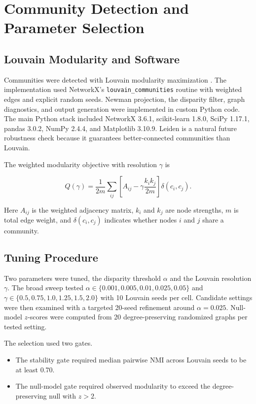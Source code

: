 \documentclass[10pt,twocolumn]{article}
\begin{document}
\section{Community Detection and Parameter Selection}

\subsection{Louvain Modularity and Software}

Communities were detected with Louvain modularity maximization \cite{blondel2008}. The implementation used NetworkX's \texttt{louvain\_communities} routine with weighted edges and explicit random seeds. Newman projection, the disparity filter, graph diagnostics, and output generation were implemented in custom Python code. The main Python stack included NetworkX 3.6.1, scikit-learn 1.8.0, SciPy 1.17.1, pandas 3.0.2, NumPy 2.4.4, and Matplotlib 3.10.9. Leiden \cite{traag2019} is a natural future robustness check because it guarantees better-connected communities than Louvain.

The weighted modularity objective with resolution $\gamma$ is

\begin{equation}
Q(\gamma)=\frac{1}{2m}\sum_{ij}
\left[
A_{ij} - \gamma\frac{k_i k_j}{2m}
\right]\delta(c_i,c_j).
\end{equation}

Here $A_{ij}$ is the weighted adjacency matrix, $k_i$ and $k_j$ are node strengths, $m$ is total edge weight, and $\delta(c_i,c_j)$ indicates whether nodes $i$ and $j$ share a community.

\subsection{Tuning Procedure}

Two parameters were tuned, the disparity threshold $\alpha$ and the Louvain resolution $\gamma$. The broad sweep tested $\alpha \in \{0.001,0.005,0.01,0.025,0.05\}$ and $\gamma \in \{0.5,0.75,1.0,1.25,1.5,2.0\}$ with 10 Louvain seeds per cell. Candidate settings were then examined with a targeted 20-seed refinement around $\alpha=0.025$. Null-model $z$-scores were computed from 20 degree-preserving randomized graphs per tested setting.

The selection used two gates.

\begin{itemize}
    \item The stability gate required median pairwise NMI across Louvain seeds to be at least 0.70.
    \item The null-model gate required observed modularity to exceed the degree-preserving null with $z>2$.
\end{itemize}
\end{document}
